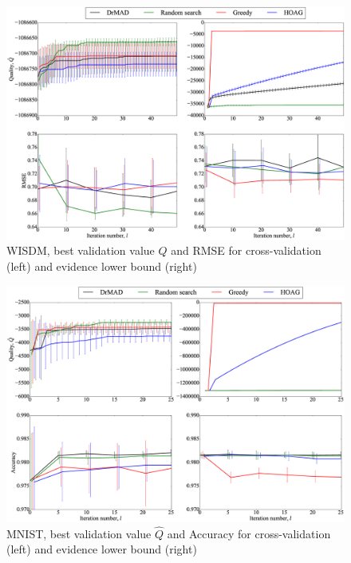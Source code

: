 \documentclass[smallcondensed]{svjour3}
\begin{document}
    \begin{figure}

    \includegraphics[width=\linewidth]{plots/Fig_wisdm.eps}
\caption{WISDM,  best validation value $\hat{Q}$ and RMSE  for cross-validation (left) and evidence lower bound (right)}    
\label{fig:wisdm}
    
    \end{figure}


    \begin{figure}

    \includegraphics[width=\linewidth]{plots/Fig_mnist.eps}

    \caption{MNIST, best validation value  $\hat{Q}$ and Accuracy  for cross-validation (left) and evidence lower bound (right)}
    \label{fig:mnist}
    \end{figure}
\end{document}
